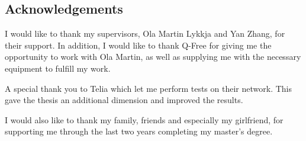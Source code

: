 
\vspace*{2cm}
\thispagestyle{plain}

\begin{center}


\section*{Acknowledgements} \label{section:acknowledgements}
\end{center}

I would like to thank my supervisors, Ola Martin Lykkja and Yan Zhang, for their support. In addition, I would like to thank Q-Free for giving me the opportunity to work with Ola Martin, as well as supplying me with the necessary equipment to fulfill my work.

A special thank you to Telia which let me perform tests on their network. This gave the thesis an additional dimension and improved the results.

I would also like to thank my family, friends and especially my girlfriend, for supporting me through the last two years completing my master's degree.
